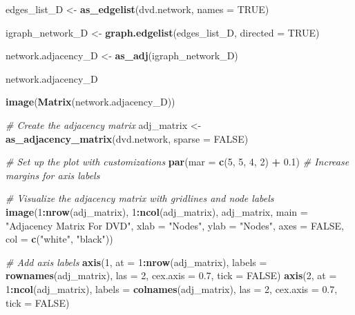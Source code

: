 \documentclass[
]{article}
\newenvironment{Shaded}{\begin{snugshade}}{\end{snugshade}}
\newcommand{\AttributeTok}[1]{\textcolor[rgb]{0.13,0.29,0.53}{#1}}
\newcommand{\CommentTok}[1]{\textcolor[rgb]{0.56,0.35,0.01}{\textit{#1}}}
\newcommand{\ConstantTok}[1]{\textcolor[rgb]{0.56,0.35,0.01}{#1}}
\newcommand{\DecValTok}[1]{\textcolor[rgb]{0.00,0.00,0.81}{#1}}
\newcommand{\FloatTok}[1]{\textcolor[rgb]{0.00,0.00,0.81}{#1}}
\newcommand{\FunctionTok}[1]{\textcolor[rgb]{0.13,0.29,0.53}{\textbf{#1}}}
\newcommand{\NormalTok}[1]{#1}
\newcommand{\OtherTok}[1]{\textcolor[rgb]{0.56,0.35,0.01}{#1}}
\newcommand{\SpecialCharTok}[1]{\textcolor[rgb]{0.81,0.36,0.00}{\textbf{#1}}}
\newcommand{\StringTok}[1]{\textcolor[rgb]{0.31,0.60,0.02}{#1}}
\begin{document}
\begin{Shaded}
\begin{Highlighting}[]
\NormalTok{edges\_list\_D }\OtherTok{\textless{}{-}} \FunctionTok{as\_edgelist}\NormalTok{(dvd.network, }\AttributeTok{names =} \ConstantTok{TRUE}\NormalTok{)}


\NormalTok{igraph\_network\_D }\OtherTok{\textless{}{-}} \FunctionTok{graph.edgelist}\NormalTok{(edges\_list\_D, }\AttributeTok{directed =} \ConstantTok{TRUE}\NormalTok{)}

\NormalTok{network.adjacency\_D }\OtherTok{\textless{}{-}} \FunctionTok{as\_adj}\NormalTok{(igraph\_network\_D)}

\NormalTok{network.adjacency\_D}

\FunctionTok{image}\NormalTok{(}\FunctionTok{Matrix}\NormalTok{(network.adjacency\_D))}

\CommentTok{\# Create the adjacency matrix}
\NormalTok{adj\_matrix }\OtherTok{\textless{}{-}} \FunctionTok{as\_adjacency\_matrix}\NormalTok{(dvd.network, }\AttributeTok{sparse =} \ConstantTok{FALSE}\NormalTok{)}

\CommentTok{\# Set up the plot with customizations}
\FunctionTok{par}\NormalTok{(}\AttributeTok{mar =} \FunctionTok{c}\NormalTok{(}\DecValTok{5}\NormalTok{, }\DecValTok{5}\NormalTok{, }\DecValTok{4}\NormalTok{, }\DecValTok{2}\NormalTok{) }\SpecialCharTok{+} \FloatTok{0.1}\NormalTok{)  }\CommentTok{\# Increase margins for axis labels}

\CommentTok{\# Visualize the adjacency matrix with gridlines and node labels}
\FunctionTok{image}\NormalTok{(}\DecValTok{1}\SpecialCharTok{:}\FunctionTok{nrow}\NormalTok{(adj\_matrix), }\DecValTok{1}\SpecialCharTok{:}\FunctionTok{ncol}\NormalTok{(adj\_matrix), adj\_matrix, }
      \AttributeTok{main =} \StringTok{"Adjacency Matrix For DVD"}\NormalTok{, }
      \AttributeTok{xlab =} \StringTok{"Nodes"}\NormalTok{, }\AttributeTok{ylab =} \StringTok{"Nodes"}\NormalTok{, }
      \AttributeTok{axes =} \ConstantTok{FALSE}\NormalTok{, }\AttributeTok{col =} \FunctionTok{c}\NormalTok{(}\StringTok{"white"}\NormalTok{, }\StringTok{"black"}\NormalTok{))}



\CommentTok{\# Add axis labels}
\FunctionTok{axis}\NormalTok{(}\DecValTok{1}\NormalTok{, }\AttributeTok{at =} \DecValTok{1}\SpecialCharTok{:}\FunctionTok{nrow}\NormalTok{(adj\_matrix), }\AttributeTok{labels =} \FunctionTok{rownames}\NormalTok{(adj\_matrix), }\AttributeTok{las =} \DecValTok{2}\NormalTok{, }\AttributeTok{cex.axis =} \FloatTok{0.7}\NormalTok{, }\AttributeTok{tick =} \ConstantTok{FALSE}\NormalTok{)}
\FunctionTok{axis}\NormalTok{(}\DecValTok{2}\NormalTok{, }\AttributeTok{at =} \DecValTok{1}\SpecialCharTok{:}\FunctionTok{ncol}\NormalTok{(adj\_matrix), }\AttributeTok{labels =} \FunctionTok{colnames}\NormalTok{(adj\_matrix), }\AttributeTok{las =} \DecValTok{2}\NormalTok{, }\AttributeTok{cex.axis =} \FloatTok{0.7}\NormalTok{, }\AttributeTok{tick =} \ConstantTok{FALSE}\NormalTok{)}


\end{Highlighting}
\end{Shaded}
\end{document}
